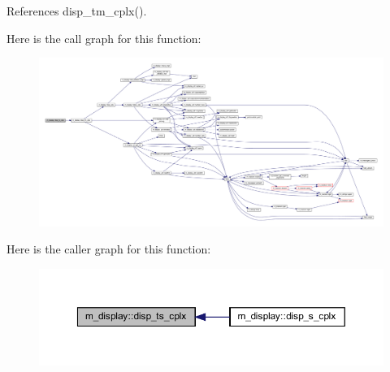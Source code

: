 


References disp\+\_\+tm\+\_\+cplx().

Here is the call graph for this function\+:
\nopagebreak
\begin{figure}[H]
\begin{center}
\leavevmode
\includegraphics[width=350pt]{namespacem__display_a008a43400dfc972afef14c2c6d1ddbf3_cgraph}
\end{center}
\end{figure}
Here is the caller graph for this function\+:
\nopagebreak
\begin{figure}[H]
\begin{center}
\leavevmode
\includegraphics[width=350pt]{namespacem__display_a008a43400dfc972afef14c2c6d1ddbf3_icgraph}
\end{center}
\end{figure}
\mbox{\label{namespacem__display_ae661abeb19eae92ba50504a58d7c8c26}} 
